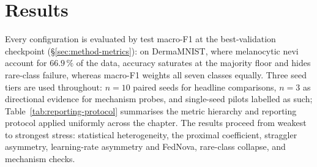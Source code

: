 \documentclass[11pt,a4paper]{report}
\begin{document}



\chapter{Results}
\label{ch:results}






Every configuration is evaluated by test macro-F1 at the best-validation checkpoint
(\S\ref{sec:method-metrics}): on DermaMNIST, where melanocytic nevi account for
$66.9\,\%$ of the data, accuracy saturates at the
majority floor and hides rare-class failure, whereas macro-F1 weights all seven
classes equally. Three seed tiers are used throughout: $n=10$ paired seeds for
headline comparisons, $n=3$ as directional evidence for mechanism probes, and
single-seed pilots labelled as such; Table~\ref{tab:reporting-protocol} summarises
the metric hierarchy and reporting protocol applied uniformly across the chapter.
The results proceed from weakest to strongest stress: statistical heterogeneity,
the proximal coefficient, straggler asymmetry, learning-rate asymmetry and FedNova,
rare-class collapse, and mechanism checks.


\end{document}
